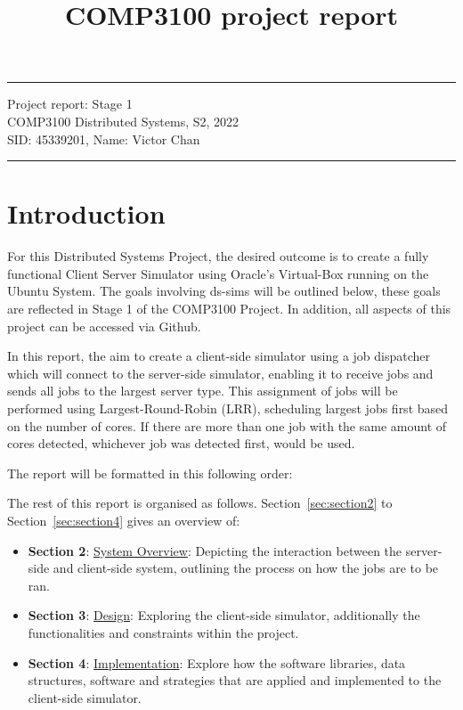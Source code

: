 \documentclass[a4paper]{article} %
\begin{document}

\title{COMP3100 project report} %
\fancyhead[C]{}
\hrule \medskip %
\begin{minipage}{1\textwidth} %
\centering 
\large %
Project report: Stage 1\\ %
COMP3100 Distributed Systems, S2, 2022\\
\normalsize %
SID: 45339201, Name: Victor Chan
\end{minipage}
\medskip\hrule %
\bigskip

\section{Introduction}
For this Distributed Systems Project, the desired outcome is to create a fully functional Client Server Simulator using Oracle's Virtual-Box \cite{VirtualBox} running on the Ubuntu \cite{Ubuntu} System. The goals involving ds-sims will be outlined below, these goals are reflected in Stage 1 of the COMP3100 Project. In addition, all aspects of this project can be accessed via Github\cite{github}.
\bigskip

In this report, the aim to create a client-side simulator using a job dispatcher which will connect to the server-side simulator, enabling it to receive jobs and sends all jobs to the largest server type. This assignment of jobs will be performed using Largest-Round-Robin (LRR), scheduling largest jobs first based on the number of cores. If there are more than one job with the same amount of cores detected, whichever job was detected first, would be used.
\bigskip

The report will be formatted in this following order:
\bigskip

The rest of this report is organised as follows. Section~\ref{sec:section2} to Section~\ref{sec:section4} gives an overview of:
\begin{itemize}
  \item \textbf{Section 2}: \underline{System Overview}: Depicting the interaction between the server-side and client-side system, outlining the process on how the jobs are to be ran.
  \item \textbf{Section 3}: \underline{Design}: Exploring the client-side simulator, additionally the functionalities and constraints within the project.
  \item \textbf{Section 4}: \underline{Implementation}: Explore how the software libraries, data structures, software and strategies that are applied and implemented to the client-side simulator.
\end{itemize}
\end{document}
